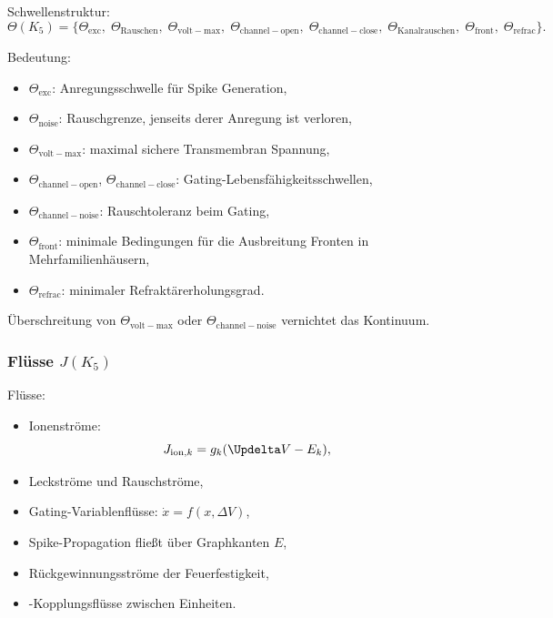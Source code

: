 Schwellenstruktur:
\[
\Theta(K_5)=\{
\Theta_{\mathrm{exc}},\;
\Theta_{\mathrm{Rauschen}},\;
\Theta_{\mathrm{volt-max}},\;
\Theta_{\mathrm{channel-open}},\;
\Theta_{\mathrm{channel-close}},\;
\Theta_{\mathrm{Kanalrauschen}},\;
\Theta_{\mathrm{front}},\;
\Theta_{\mathrm{refrac}}
\}.
\]

Bedeutung:
\begin{itemize}
    \item $\Theta_{\mathrm{exc}}$: Anregungsschwelle für Spike
          Generation,
    \item $\Theta_{\mathrm{noise}}$: Rauschgrenze, jenseits derer Anregung
          ist verloren,
    \item $\Theta_{\mathrm{volt-max}}$: maximal sichere Transmembran
          Spannung,
    \item $\Theta_{\mathrm{channel-open}}$, $\Theta_{\mathrm{channel-close}}$:
          Gating-Lebensfähigkeitsschwellen,
    \item $\Theta_{\mathrm{channel-noise}}$: Rauschtoleranz beim Gating,
    \item $\Theta_{\mathrm{front}}$: minimale Bedingungen für die Ausbreitung
          Fronten in Mehrfamilienhäusern,
    \item $\Theta_{\mathrm{refrac}}$: minimaler Refraktärerholungsgrad.
\end{itemize}

Überschreitung von $\Theta_{\mathrm{volt-max}}$ oder $\Theta_{\mathrm{channel-noise}}$
vernichtet das Kontinuum.

\subsubsection{Flüsse \texorpdfstring{$J(K_5)$}{J(K_5)}}

Flüsse:
\begin{itemize}
    \item Ionenströme:
    \[
    J_{\mathrm{ion},k} = g_k(\Updelta V - E_k),
    \]
    \item Leckströme und Rauschströme,
    \item Gating-Variablenflüsse:
          $\dot{x} = f(x,\Delta V)$,
    \item Spike-Propagation fließt über Graphkanten $E$,
    \item Rückgewinnungsströme der Feuerfestigkeit,
    \item-Kopplungsflüsse zwischen Einheiten.
\end{itemize}

